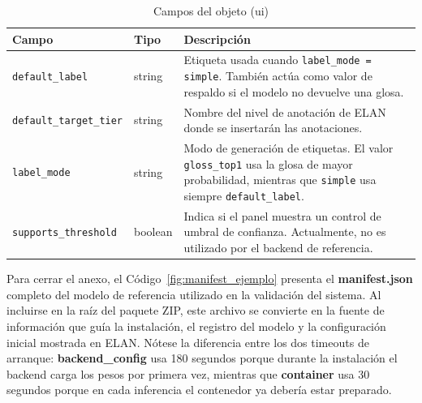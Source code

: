 \documentclass[11pt,a4paper]{article}
\begin{document}
\begin{table}[H]
\centering
\caption{Campos del objeto (ui)}
\label{tab:manifest_ui}
\scriptsize
\renewcommand{\arraystretch}{1.08}
\setlength{\tabcolsep}{4pt}

\begin{tabular}{
    >{\raggedright\arraybackslash}p{3.5cm}
    >{\raggedright\arraybackslash}p{1.7cm}
    >{\raggedright\arraybackslash}p{8.0cm}
}
\toprule
\textbf{Campo} & \textbf{Tipo} & \textbf{Descripción} \\
\midrule
\texttt{default\_label} & string & Etiqueta usada cuando \texttt{label\_mode = simple}. También actúa como valor de respaldo si el modelo no devuelve una glosa. \\
\texttt{default\_target\_tier} & string & Nombre del nivel de anotación de ELAN donde se insertarán las anotaciones. \\
\texttt{label\_mode} & string & Modo de generación de etiquetas. El valor \texttt{gloss\_top1} usa la glosa de mayor probabilidad, mientras que \texttt{simple} usa siempre \texttt{default\_label}. \\
\texttt{supports\_threshold} & boolean & Indica si el panel muestra un control de umbral de confianza. Actualmente, no es utilizado por el backend de referencia. \\
\bottomrule
\end{tabular}
\end{table}

Para cerrar el anexo, el Código~\ref{fig:manifest_ejemplo} presenta el \textbf{manifest.json} completo del modelo de referencia utilizado en la validación del sistema. Al incluirse en la raíz del paquete ZIP, este archivo se convierte en la fuente de información que guía la instalación, el registro del modelo y la configuración inicial mostrada en ELAN. Nótese la diferencia entre los dos timeouts de arranque: \textbf{backend\_config} usa 180 segundos porque durante la instalación el backend carga los pesos por primera vez, mientras que \textbf{container} usa 30 segundos porque en cada inferencia el contenedor ya debería estar preparado.
\end{document}
